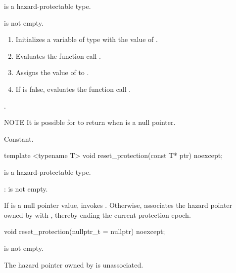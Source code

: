 \begin{itemdescr}

\mandates
{} is a hazard-protectable type.

\expects
{} is not empty.

\effects
\begin{enumerate}
\item Initializes a variable  of type  with the value of .
\item Evaluates the function call .
\item Assigns the value of  to .
\item If  is false, evaluates the function call .
\end{enumerate}

\returns
{}. 

NOTE It is possible for  to return  when  is a null pointer.

\complexity
Constant.

\end{itemdescr}

\begin{itemdecl}
template <typename T> void reset_protection(const T* ptr) noexcept;
\end{itemdecl}

\begin{itemdescr}

\mandates
{} is a hazard-protectable type.

{}: 
 is not empty.

\effects 
If  is a null pointer value, invokes . Otherwise, associates the hazard pointer owned by  with , thereby ending the current protection epoch.

\end{itemdescr}

\begin{itemdecl}
void reset_protection(nullptr_t = nullptr) noexcept;
\end{itemdecl}

\begin{itemdescr}

\expects
{} is not empty.

\ensures
The hazard pointer owned by  is unassociated.

\end{itemdescr}

